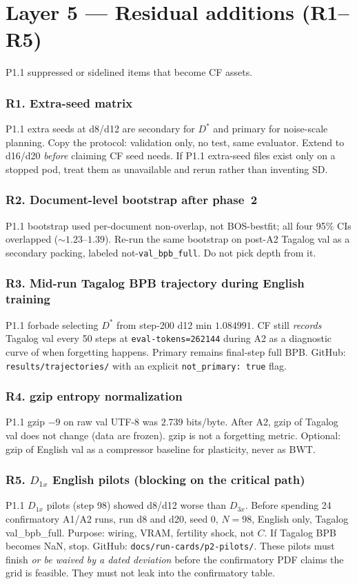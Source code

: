 \documentclass[11pt,a4paper]{article}
\begin{document}
\section{Layer 5 --- Residual additions (R1--R5)}
\label{sec:L5}

P1.1 suppressed or sidelined items that become CF assets.

\subsubsection*{R1. Extra-seed matrix}
P1.1 extra seeds at d8/d12 are secondary for $D^{\ast}$ and primary for noise-scale planning. Copy the protocol: validation only, no test, same evaluator. Extend to d16/d20 \emph{before} claiming CF seed needs. If P1.1 extra-seed files exist only on a stopped pod, treat them as unavailable and rerun rather than inventing SD.

\subsubsection*{R2. Document-level bootstrap after phase~2}
P1.1 bootstrap used per-document non-overlap, not BOS-bestfit; all four 95\% CIs overlapped ($\sim 1.23$--$1.39$). Re-run the same bootstrap on post-A2 Tagalog val as a secondary packing, labeled not-\texttt{val\_bpb\_full}. Do not pick depth from it.

\subsubsection*{R3. Mid-run Tagalog BPB trajectory during English training}
P1.1 forbade selecting $D^{\ast}$ from step-200 d12 min $1.084991$. CF still \emph{records} Tagalog val every 50 steps at \texttt{eval-tokens=262144} during A2 as a diagnostic curve of when forgetting happens. Primary remains final-step full BPB. GitHub: \texttt{results/trajectories/} with an explicit \texttt{not\_primary: true} flag.

\subsubsection*{R4. gzip entropy normalization}
P1.1 gzip $-9$ on raw val UTF-8 was $2.739$ bits/byte. After A2, gzip of Tagalog val does not change (data are frozen). gzip is not a forgetting metric. Optional: gzip of English val as a compressor baseline for plasticity, never as BWT.

\subsubsection*{R5. $D_{1x}$ English pilots (blocking on the critical path)}
P1.1 $D_{1x}$ pilots (step 98) showed d8/d12 worse than $D_{3x}$. Before spending 24 confirmatory A1/A2 runs, run d8 and d20, seed 0, $N=98$, English only, Tagalog val\_bpb\_full. Purpose: wiring, VRAM, fertility shock, not $C$. If Tagalog BPB becomes NaN, stop. GitHub: \texttt{docs/run-cards/p2-pilots/}. These pilots must finish \emph{or be waived by a dated deviation} before the confirmatory PDF claims the grid is feasible. They must not leak into the confirmatory table.
\end{document}
